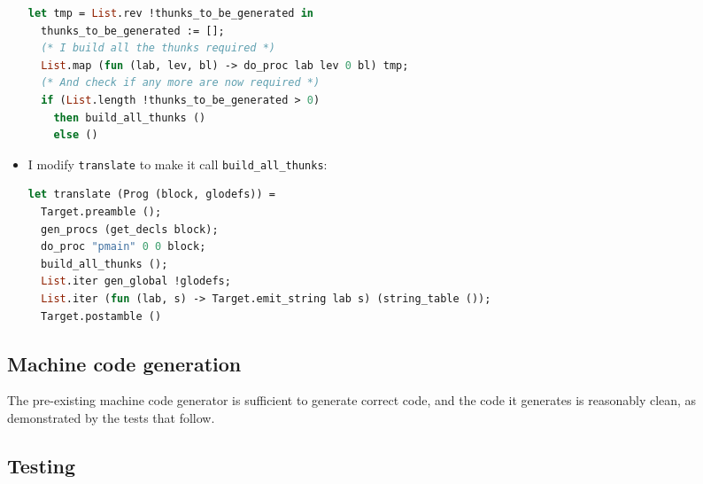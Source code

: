 \documentclass[a4paper,10pt]{article}
\begin{document}
\begin{itemize}
\begin{lstlisting}[language=ml]
  let tmp = List.rev !thunks_to_be_generated in
  thunks_to_be_generated := [];
  (* I build all the thunks required *)
  List.map (fun (lab, lev, bl) -> do_proc lab lev 0 bl) tmp;
  (* And check if any more are now required *)
  if (List.length !thunks_to_be_generated > 0)
    then build_all_thunks ()
    else ()
\end{lstlisting}
    \item I modify \texttt{translate} to make it call \texttt{build\_all\_thunks}:
\begin{lstlisting}[language=ml]
let translate (Prog (block, glodefs)) =
  Target.preamble ();
  gen_procs (get_decls block);
  do_proc "pmain" 0 0 block;
  build_all_thunks ();
  List.iter gen_global !glodefs;
  List.iter (fun (lab, s) -> Target.emit_string lab s) (string_table ());
  Target.postamble ()
\end{lstlisting}

\end{itemize}
\subsection{Machine code generation}
The pre-existing machine code generator is sufficient to generate correct code, and the code it generates is reasonably clean, as demonstrated by the tests that follow.
\subsection{Testing}
\end{document}
